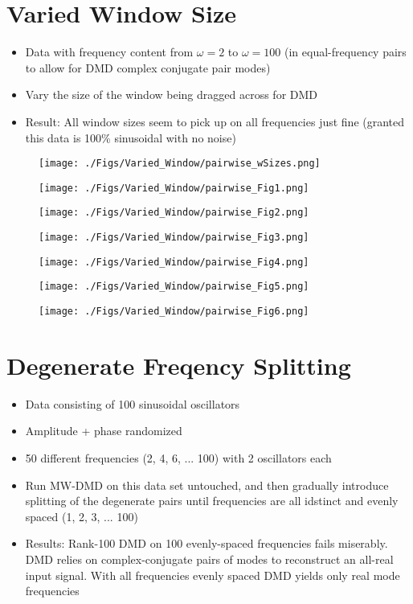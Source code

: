 \documentclass[11pt,reqno]{amsart}
\begin{document}
\section{Varied Window Size}
\begin{itemize}
\item
Data with frequency content from $\omega = 2$ to $\omega = 100$ (in equal-frequency pairs to allow for DMD complex conjugate pair modes)
\item
Vary the size of the window being dragged across for DMD
\item
Result: All window sizes seem to pick up on all frequencies just fine (granted this data is 100\% sinusoidal with no noise)
\end{itemize}

\begin{figure}[htb!]
\texttt{[image: ./Figs/Varied\_Window/pairwise\_wSizes.png]}
\end{figure}
\begin{figure}[htb!]
\texttt{[image: ./Figs/Varied\_Window/pairwise\_Fig1.png]}
\end{figure}
\begin{figure}[htb!]
\texttt{[image: ./Figs/Varied\_Window/pairwise\_Fig2.png]}
\end{figure}
\begin{figure}[htb!]
\texttt{[image: ./Figs/Varied\_Window/pairwise\_Fig3.png]}
\end{figure}
\begin{figure}[htb!]
\texttt{[image: ./Figs/Varied\_Window/pairwise\_Fig4.png]}
\end{figure}
\begin{figure}[htb!]
\texttt{[image: ./Figs/Varied\_Window/pairwise\_Fig5.png]}
\end{figure}
\begin{figure}[htb!]
\texttt{[image: ./Figs/Varied\_Window/pairwise\_Fig6.png]}
\end{figure}

\newpage
\section{Degenerate Freqency Splitting}
\begin{itemize}
\item
Data consisting of 100 sinusoidal oscillators
\item
Amplitude + phase randomized
\item
50 different frequencies (2, 4, 6, ... 100) with 2 oscillators each
\item
Run MW-DMD on this data set untouched, and then gradually introduce splitting of the degenerate pairs until frequencies are all idstinct and evenly spaced (1, 2, 3, ... 100)
\item
Results: Rank-100 DMD on 100 evenly-spaced frequencies fails miserably. DMD relies on complex-conjugate pairs of modes to reconstruct an all-real input signal. With all frequencies evenly spaced DMD yields only real mode frequencies
\end{itemize}
\end{document}
